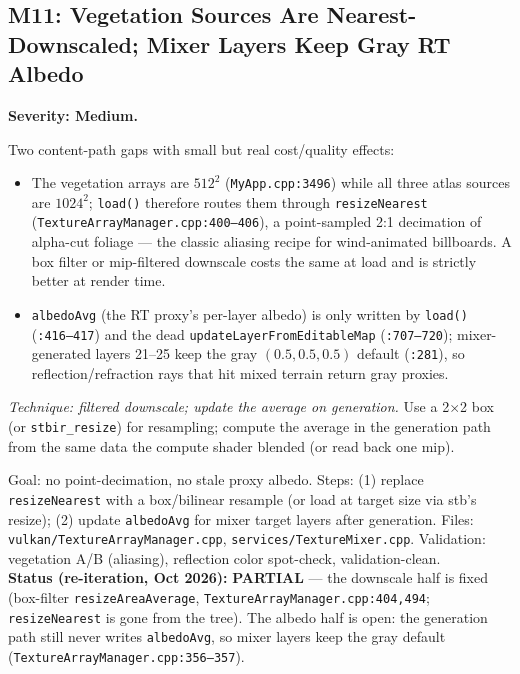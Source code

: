 \documentclass[11pt,a4paper]{article}
\begin{document}
\subsection{M11: Vegetation Sources Are Nearest-Downscaled; Mixer Layers Keep Gray RT Albedo}
\label{sec:m11}

\textbf{Severity: Medium.}

Two content-path gaps with small but real cost/quality effects:

\begin{itemize}[leftmargin=1.4em,itemsep=2pt]
\item The vegetation arrays are $512^2$ (\texttt{MyApp.cpp:3496}) while all
three atlas sources are $1024^2$; \texttt{load()} therefore routes them
through \texttt{resizeNearest} (\texttt{TextureArrayManager.cpp:400--406}), a
point-sampled 2:1 decimation of alpha-cut foliage --- the classic aliasing
recipe for wind-animated billboards. A box filter or mip-filtered downscale
costs the same at load and is strictly better at render time.
\item \texttt{albedoAvg} (the RT proxy's per-layer albedo) is only written by
\texttt{load()} (\texttt{:416--417}) and the dead
\texttt{updateLayerFromEditableMap} (\texttt{:707--720}); mixer-generated
layers 21--25 keep the gray $(0.5,0.5,0.5)$ default
(\texttt{:281}), so reflection/refraction rays that hit mixed terrain return
gray proxies.
\end{itemize}

\textit{Technique: filtered downscale; update the average on generation.} Use a
2$\times$2 box (or \texttt{stbir\_resize}) for resampling; compute the average
in the generation path from the same data the compute shader blended (or read
back one mip).

\begin{tcolorbox}[promptbox={Prompt --- M11: filtered vegetation downscale, live RT albedo}]
Goal: no point-decimation, no stale proxy albedo. Steps: (1) replace
\texttt{resizeNearest} with a box/bilinear resample (or load at target size via
stb's resize); (2) update \texttt{albedoAvg} for mixer target layers after
generation. Files: \texttt{vulkan/TextureArrayManager.cpp},
\texttt{services/TextureMixer.cpp}. Validation: vegetation A/B (aliasing),
reflection color spot-check, validation-clean.
\\ \textbf{Status (re-iteration, Oct 2026):} \textbf{PARTIAL} --- the downscale
half is fixed (box-filter \texttt{resizeAreaAverage},
\texttt{TextureArrayManager.cpp:404,494}; \texttt{resizeNearest} is gone from
the tree). The albedo half is open: the generation path still never writes
\texttt{albedoAvg}, so mixer layers keep the gray default
(\texttt{TextureArrayManager.cpp:356--357}).
\end{tcolorbox}
\end{document}
